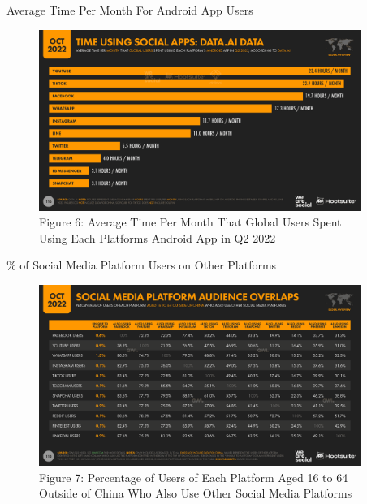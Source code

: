 \documentclass[pdf]{beamer}
\theoremstyle{remark}
\theoremstyle{definition}
\begin{document}
\begin{frame}[t]{Average Time Per Month For Android App Users}
\begin{figure}[htbp]
  \captionsetup{justification=centering}
  \includegraphics[height=5.9cm, trim=0.0cm 0.0cm 0.0cm 0.0cm width=5.9cm]{Images/Hootsuite_SocialMedia_1022_2.png}
  \caption{Figure {\color{franklinblue} 6}: Average Time Per Month That Global Users Spent \\ Using Each Platforms Android App in Q2 2022}
\end{figure}
\end{frame}

\begin{frame}[t]{\% of Social Media Platform Users on Other Platforms}
\begin{figure}[htbp]
  \captionsetup{justification=centering}
  \includegraphics[height=5.9cm, trim=0.0cm 0.0cm 0.0cm 0.0cm width=5.9cm]{Images/Hootsuite_SocialMedia_1022_3.png}
  \caption{Figure {\color{franklinblue} 7}: Percentage of Users of Each Platform Aged 16 to 64 \\ Outside of China Who Also Use Other Social Media Platforms}
\end{figure}
\end{frame}
\end{document}

